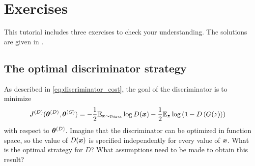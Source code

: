 \section{Exercises}

This tutorial includes three exercises to check your understanding.
The solutions are given in .

\subsection{The optimal discriminator strategy}
\label{sec:opt_d}

As described in \eqref{eq:discriminator_cost}, the goal of the discriminator is to minimize
\begin{equation}
  J^{(D)}({\bm{\theta}}^{(D)}, {\bm{\theta}}^{(G)}) = -\frac{1}{2} \mathbb{E}_{{\bm{x}} \sim p_{\rm{data}}} \log D({\bm{x}}) - \frac{1}{2} \mathbb{E}_{{\bm{z}}} \log \left(1 - D\left( G(z) \right) \right)
\end{equation}
with respect to ${\bm{\theta}}^{(D)}$.
Imagine that the discriminator can be optimized in function space, so the value of
$D({\bm{x}})$ is specified independently for every value of ${\bm{x}}$.
What is the optimal strategy for $D$?
What assumptions need to be made to obtain this result?

